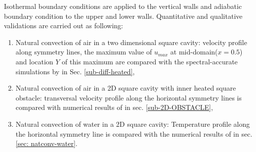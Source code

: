 \noindent Isothermal boundary conditions are applied to the vertical walls and adiabatic boundary condition to the upper and lower walls.
Quantitative and qualitative validations are carried out as following:
\begin{enumerate}[label=(\roman*)]
\item Natural convection of air in a two dimensional square cavity: velocity profile along symmetry lines, the maximum value of $u_{max}$ at mid-domain($x=0.5$) and location $Y$ of this maximum  are compared with the spectral-accurate simulations by \cite{LeQuere91} in Sec. \ref{sub-diff-heated}, 
\item Natural convection of air in a 2D square cavity with inner heated square obstacle: transversal velocity profile along the  horizontal symmetry lines is compared with numerical results of \cite{Raluca2013} 
in sec. \ref{sub-2D-OBSTACLE}, 
\item Natural convection of water in a 2D square cavity: Temperature profile along the horizontal symmetry line is compared with the numerical results of \cite{Kowalewski-2003} in sec. \ref{sec: natconv-water}.
\end{enumerate}

